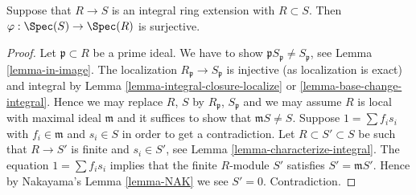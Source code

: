 \begin{lemma}
\label{lemma-integral-overring-surjective}
Suppose that $R \to S$ is an integral
ring extension with $R \subset S$.
Then $\varphi : \Spec(S) \to \Spec(R)$
is surjective.
\end{lemma}

\begin{proof}
Let $\mathfrak p \subset R$ be a prime ideal.
We have to show $\mathfrak pS_{\mathfrak p} \not = S_{\mathfrak p}$, see
Lemma \ref{lemma-in-image}.
The localization $R_{\mathfrak p} \to S_{\mathfrak p}$ is injective
(as localization is exact) and integral by
Lemma \ref{lemma-integral-closure-localize} or
\ref{lemma-base-change-integral}.
Hence we may replace $R$, $S$ by $R_{\mathfrak p}$, $S_{\mathfrak p}$ and
we may assume $R$ is local with maximal ideal $\mathfrak m$ and
it suffices to show that $\mathfrak mS \not = S$.
Suppose $1 = \sum f_i s_i$ with $f_i \in \mathfrak m$
and $s_i \in S$ in order to get a contradiction.
Let $R \subset S' \subset S$
be such that $R \to S'$ is finite and $s_i \in S'$, see
Lemma \ref{lemma-characterize-integral}.
The equation $1 = \sum f_i s_i$ implies that
the finite $R$-module $S'$ satisfies $S' = \mathfrak m S'$. Hence by
Nakayama's Lemma \ref{lemma-NAK}
we see $S' = 0$. Contradiction.
\end{proof}